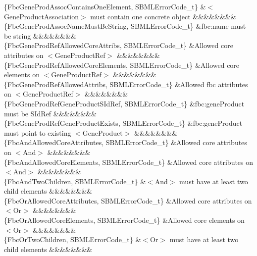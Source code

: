 \begin{DoxyParagraph}{}
\begin{longtabu}
\{Fbc\+Gene\+Prod\+Assoc\+Contains\+One\+Element, S\+B\+M\+L\+Error\+Code\+\_\+t\} &{\ttfamily $<$Gene\+Product\+Association$>$} must contain one concrete object &&&&&&&&\\
\{Fbc\+Gene\+Prod\+Assoc\+Name\+Must\+Be\+String, S\+B\+M\+L\+Error\+Code\+\_\+t\} &\textquotesingle{}fbc\+:name\textquotesingle{} must be string &&&&&&&&\\
\{Fbc\+Gene\+Prod\+Ref\+Allowed\+Core\+Attribs, S\+B\+M\+L\+Error\+Code\+\_\+t\} &Allowed core attributes on {\ttfamily $<$Gene\+Product\+Ref$>$} &&&&&&&&\\
\{Fbc\+Gene\+Prod\+Ref\+Allowed\+Core\+Elements, S\+B\+M\+L\+Error\+Code\+\_\+t\} &Allowed core elements on {\ttfamily $<$Gene\+Product\+Ref$>$} &&&&&&&&\\
\{Fbc\+Gene\+Prod\+Ref\+Allowed\+Attribs, S\+B\+M\+L\+Error\+Code\+\_\+t\} &Allowed fbc attributes on {\ttfamily $<$Gene\+Product\+Ref$>$} &&&&&&&&\\
\{Fbc\+Gene\+Prod\+Ref\+Gene\+Product\+S\+Id\+Ref, S\+B\+M\+L\+Error\+Code\+\_\+t\} &\textquotesingle{}fbc\+:gene\+Product\textquotesingle{} must be S\+Id\+Ref &&&&&&&&\\
\{Fbc\+Gene\+Prod\+Ref\+Gene\+Product\+Exists, S\+B\+M\+L\+Error\+Code\+\_\+t\} &\textquotesingle{}fbc\+:gene\+Product\textquotesingle{} must point to existing {\ttfamily $<$Gene\+Product$>$} &&&&&&&&\\
\{Fbc\+And\+Allowed\+Core\+Attributes, S\+B\+M\+L\+Error\+Code\+\_\+t\} &Allowed core attributes on {\ttfamily $<$And$>$} &&&&&&&&\\
\{Fbc\+And\+Allowed\+Core\+Elements, S\+B\+M\+L\+Error\+Code\+\_\+t\} &Allowed core attributes on {\ttfamily $<$And$>$} &&&&&&&&\\
\{Fbc\+And\+Two\+Children, S\+B\+M\+L\+Error\+Code\+\_\+t\} &{\ttfamily $<$And$>$} must have at least two child elements &&&&&&&&\\
\{Fbc\+Or\+Allowed\+Core\+Attributes, S\+B\+M\+L\+Error\+Code\+\_\+t\} &Allowed core attributes on {\ttfamily $<$Or$>$} &&&&&&&&\\
\{Fbc\+Or\+Allowed\+Core\+Elements, S\+B\+M\+L\+Error\+Code\+\_\+t\} &Allowed core elements on {\ttfamily $<$Or$>$} &&&&&&&&\\
\{Fbc\+Or\+Two\+Children, S\+B\+M\+L\+Error\+Code\+\_\+t\} &{\ttfamily $<$Or$>$} must have at least two child elements &&&&&&&&\\

\end{longtabu}
\end{DoxyParagraph}
